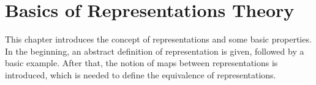 \section{Basics of Representations Theory}

This chapter introduces the concept of representations and some basic properties.
In the beginning, an abstract definition of representation is given, followed by a basic example.
After that, the notion of maps between representations is introduced, which is needed to define the equivalence of representations.



